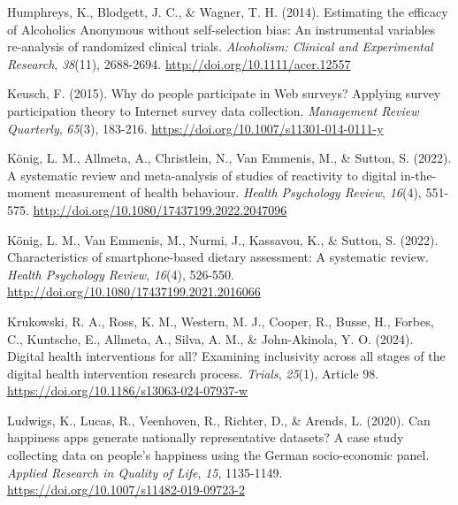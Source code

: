 \documentclass[authordate, empirical]{jote-new-article}
\begin{document}
	Humphreys, K., Blodgett, J. C., \& Wagner, T. H. (2014). Estimating the efficacy of Alcoholics Anonymous without self-selection bias: An instrumental variables re-analysis of randomized clinical trials. \emph{Alcoholism: Clinical and Experimental Research},\emph{ 38}(11), 2688-2694. \href{http://doi.org/10.1111/acer.12557}{http://doi.org/10.1111/acer.12557}



	Keusch, F. (2015). Why do people participate in Web surveys? Applying survey participation theory to Internet survey data collection. \emph{Management Review Quarterly},\emph{ 65}(3), 183-216. \href{https://doi.org/10.1007/s11301-014-0111-y}{https://doi.org/10.1007/s11301-014-0111-y}



	König, L. M., Allmeta, A., Christlein, N., Van Emmenis, M., \& Sutton, S. (2022). A systematic review and meta-analysis of studies of reactivity to digital in-the-moment measurement of health behaviour. \emph{Health Psychology Review},\emph{ 16}(4), 551-575. \href{http://doi.org/10.1080/17437199.2022.2047096}{http://doi.org/10.1080/17437199.2022.2047096}



	König, L. M., Van Emmenis, M., Nurmi, J., Kassavou, K., \& Sutton, S. (2022). Characteristics of smartphone-based dietary assessment: A systematic review. \emph{Health Psychology Review},\emph{ 16}(4), 526-550. \href{http://doi.org/10.1080/17437199.2021.2016066}{http://doi.org/10.1080/17437199.2021.2016066}



	Krukowski, R. A., Ross, K. M., Western, M. J., Cooper, R., Busse, H., Forbes, C., Kuntsche, E., Allmeta, A., Silva, A. M., \& John-Akinola, Y. O. (2024). Digital health interventions for all? Examining inclusivity across all stages of the digital health intervention research process. \emph{Trials},\emph{ 25}(1), Article 98. \href{https://doi.org/10.1186/s13063-024-07937-w}{https://doi.org/10.1186/s13063-024-07937-w}



	Ludwigs, K., Lucas, R., Veenhoven, R., Richter, D., \& Arends, L. (2020). Can happiness apps generate nationally representative datasets? A case study collecting data on people's happiness using the German socio-economic panel. \emph{Applied Research in Quality of Life},\emph{ 15}, 1135-1149. \href{https://doi.org/10.1007/s11482-019-09723-2}{https://doi.org/10.1007/s11482-019-09723-2}
\end{document}
